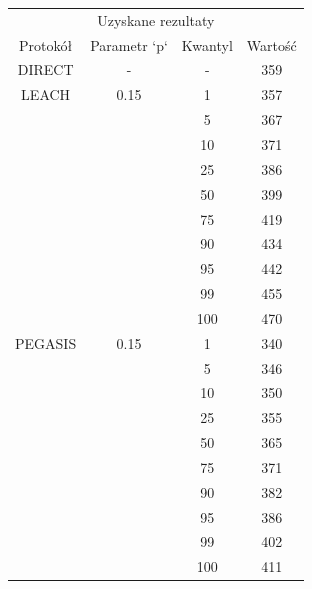\documentclass[a4paper,12pt,twoside,openany]{report}
\begin{document}
\begin{longtable}{*{4}{c}}
\toprule
\multicolumn{4}{c}{Uzyskane rezultaty} \\
Protokół	& Parametr `p`	& Kwantyl	& Wartość \\
\midrule
\endhead
DIRECT	& - 	& -	& 359 \\*
\midrule
LEACH	& 0.15	& 1	& 357 \\*
	&	& 5	& 367 \\*
	&	& 10	& 371 \\*
	&	& 25	& 386 \\*
	&	& 50	& 399 \\*
	&	& 75	& 419 \\*
	&	& 90	& 434 \\*
	&	& 95	& 442 \\*
	&	& 99	& 455 \\*
	&	& 100	& 470 \\*
\midrule
PEGASIS	& 0.15	& 1	& 340 \\*
	&	& 5	& 346 \\*
	&	& 10	& 350 \\*
	&	& 25	& 355 \\*
	&	& 50	& 365 \\*
	&	& 75	& 371 \\*
	&	& 90	& 382 \\*
	&	& 95	& 386 \\*
	&	& 99	& 402 \\*
	&	& 100	& 411 \\*
\bottomrule
\end{longtable}
\end{document}
